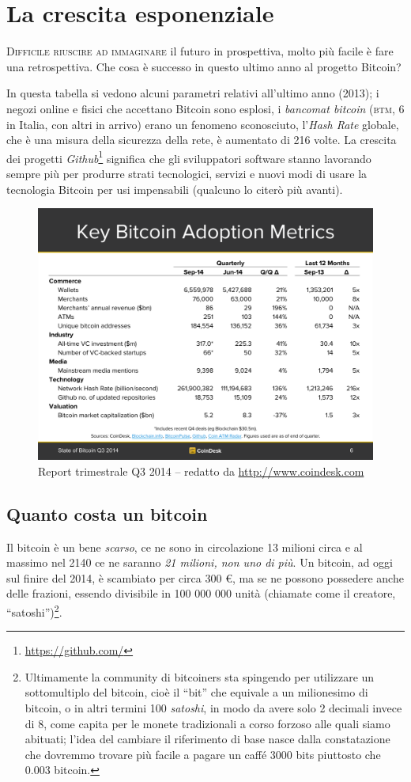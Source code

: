 \documentclass[a4paper,12pt,italian]{article}
\begin{document}
\section*{La crescita esponenziale}


\lettrine[lines=2]{D}{ifficile riuscire ad immaginare} il futuro in prospettiva, molto più
facile è fare una retrospettiva. Che cosa è successo in questo ultimo
anno al progetto Bitcoin?

In questa tabella 
si vedono alcuni parametri relativi all'ultimo anno (2013); i negozi online e fisici
che accettano Bitcoin sono esplosi, i \emph{bancomat bitcoin} (\textsc{btm}, 6 in
Italia, con altri in arrivo) erano un fenomeno sconosciuto, l’\emph{Hash Rate}
globale, che è una misura della sicurezza della rete, è aumentato di
216 volte. La crescita dei progetti \emph{Github}\footnote{\url{https://github.com/}}
significa che gli sviluppatori software stanno lavorando sempre più per
produrre strati tecnologici, servizi e nuovi modi di usare la
tecnologia Bitcoin per usi impensabili (qualcuno lo citerò più
avanti).

\begin{figure}
\centering
\includegraphics[width=.8\linewidth]{figures/metrics.pdf}
\caption{Report trimestrale Q3 2014 -- redatto da \url{http://www.coindesk.com}}
\end{figure}



\subsection*{Quanto costa un bitcoin}


Il bitcoin è un bene \emph{scarso}, ce ne sono in circolazione 13 milioni circa
e al massimo nel 2140 ce ne saranno \emph{21 milioni, non uno di più}. Un
bitcoin, ad oggi sul finire del 2014, è scambiato per circa 300 €, ma se ne possono
possedere anche delle frazioni, essendo divisibile in 100 000 000 
unità (chiamate come il creatore, “satoshi”)\footnote{Ultimamente
la community di bitcoiners sta spingendo per utilizzare un
sottomultiplo del bitcoin, cioè il “bit” che equivale a un milionesimo
di bitcoin, o in altri termini 100 \emph{satoshi}, in modo da avere solo 2
decimali invece di 8, come capita per le monete tradizionali a corso
forzoso alle quali siamo abituati; l’idea del cambiare il riferimento
di base nasce dalla constatazione che dovremmo trovare più facile a
pagare un caffé 3000 bits piuttosto che 0.003 bitcoin. 
}.
\end{document}
